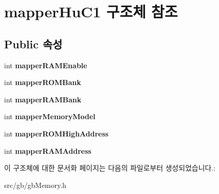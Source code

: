 \hypertarget{structmapper_hu_c1}{}\section{mapper\+Hu\+C1 구조체 참조}
\label{structmapper_hu_c1}
\subsection*{Public 속성}
\begin{DoxyCompactItemize}
\item 
\mbox{\label{structmapper_hu_c1_abed6ba52cc80f9c0571ecc9a4673c253}} 
int {\bfseries mapper\+R\+A\+M\+Enable}
\item 
\mbox{\label{structmapper_hu_c1_a7fb083af2e79a98adbcc83ff4d039c6e}} 
int {\bfseries mapper\+R\+O\+M\+Bank}
\item 
\mbox{\label{structmapper_hu_c1_a0199405980430215b615fa9fd3e46a19}} 
int {\bfseries mapper\+R\+A\+M\+Bank}
\item 
\mbox{\label{structmapper_hu_c1_a22afbac167276896703576f5e237f141}} 
int {\bfseries mapper\+Memory\+Model}
\item 
\mbox{\label{structmapper_hu_c1_a016a39f55f5441bdaed916ff0477e0c6}} 
int {\bfseries mapper\+R\+O\+M\+High\+Address}
\item 
\mbox{\label{structmapper_hu_c1_af122d3984f260f428d007fa095d2df27}} 
int {\bfseries mapper\+R\+A\+M\+Address}
\end{DoxyCompactItemize}


이 구조체에 대한 문서화 페이지는 다음의 파일로부터 생성되었습니다.\+:\begin{DoxyCompactItemize}
\item 
src/gb/gb\+Memory.\+h\end{DoxyCompactItemize}
